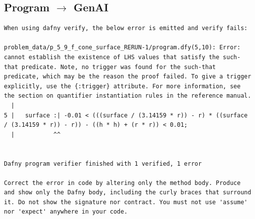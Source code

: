 \documentclass{article}
\begin{document}
\subsection*{Program $\rightarrow$ GenAI}
\begin{lstlisting}
When using dafny verify, the below error is emitted and verify fails:

problem_data/p_5_9_f_cone_surface_RERUN-1/program.dfy(5,10): Error: cannot establish the existence of LHS values that satisfy the such-that predicate. Note, no trigger was found for the such-that predicate, which may be the reason the proof failed. To give a trigger explicitly, use the {:trigger} attribute. For more information, see the section on quantifier instantiation rules in the reference manual.
  |
5 |   surface :| -0.01 < (((surface / (3.14159 * r)) - r) * ((surface / (3.14159 * r)) - r)) - ((h * h) + (r * r)) < 0.01;
  |           ^^


Dafny program verifier finished with 1 verified, 1 error

Correct the error in code by altering only the method body. Produce and show only the Dafny body, including the curly braces that surround it. Do not show the signature nor contract. You must not use 'assume' nor 'expect' anywhere in your code.
\end{lstlisting}
\end{document}
